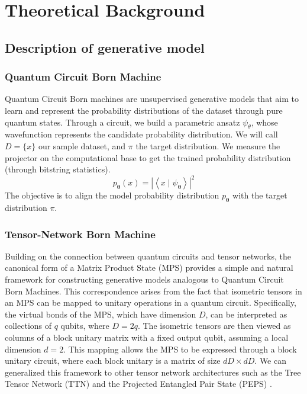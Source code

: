 \chapter{Theoretical Background}
\section{Description of generative model}

\subsection{Quantum Circuit Born Machine}
Quantum Circuit Born machines are unsupervised generative models that aim to learn and represent the probability distributions of the dataset through pure quantum states. Through a circuit, we build a parametric ansatz $\psi_{\theta}$, whose wavefunction represents the candidate probability distribution. We will call $D = \{x\}$ our sample dataset, and $\pi$ the target distribution. We measure the projector on the computational base to get the trained probability distribution (through bitstring statistics).
\[ p_{\boldsymbol{\theta}}(x)=\left|\left\langle x \mid \psi_{\boldsymbol{\theta}}\right\rangle\right|^2\]
The objective is to align the model probability distribution $p_{\boldsymbol{\theta}}$ with the target distribution $\pi$.

\subsection{Tensor-Network Born Machine}
Building on the connection between quantum circuits and tensor networks, the canonical form of a Matrix Product State (MPS) provides a simple and natural framework for constructing generative models analogous to Quantum Circuit Born Machines. This correspondence arises from the fact that isometric tensors in an MPS can be mapped to unitary operations in a quantum circuit. Specifically, the virtual bonds of the MPS, which have dimension $D$, can be interpreted as collections of $q$ qubits, where $D=2q$. The isometric tensors are then viewed as columns of a block unitary matrix with a fixed output qubit, assuming a local dimension $d=2$. This mapping allows the MPS to be expressed through a block unitary circuit, where each block unitary is a matrix of size $dD\times dD$. We can generalized this framework to other tensor network architectures such as the Tree Tensor Network (TTN) and the Projected Entangled Pair State (PEPS) \cite{haghshenas_variational_2022}. \\

